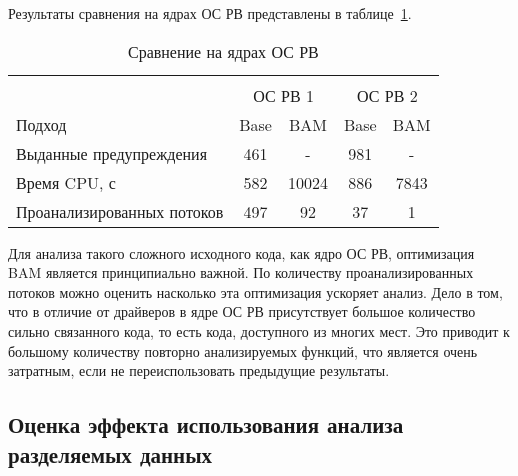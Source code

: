 Результаты сравнения на ядрах ОС РВ представлены в таблице~\ref{table-os-bam}.

  \begin{table}[h]\footnotesize \centering
    \caption{Сравнение на ядрах ОС РВ}
  	\label{table-os-bam}
    \begin{tabular}{ | l | c | c | c | c |  }
      \hline
      		& 		\multicolumn{4}{c|}{\combatmode}  \\
      		& 			 \multicolumn{2}{c|}{ОС РВ 1} & 	\multicolumn{2}{c|}{ОС РВ 2}\\ \hline
      Подход         					& Base  & BAM  		& Base  & BAM 	\\ \hline
      Выданные предупреждения			& 461   & - 	   	& 981   & -  			\\ 
  	  Время CPU, с 						& 582   & 10024		& 886   & 7843  		\\ 
      Проанализированных потоков		& 497   & 92    	& 37   	& 1  			\\ \hline
    \end{tabular}
  \end{table}

Для анализа такого сложного исходного кода, как ядро ОС РВ, оптимизация BAM является принципиально важной.
По количеству проанализированных потоков можно оценить насколько эта оптимизация ускоряет анализ.
Дело в том, что в отличие от драйверов в ядре ОС РВ присутствует большое количество сильно связанного кода, то есть кода, доступного из многих мест. 
Это приводит к большому количеству повторно анализируемых функций, что является очень затратным, если не переиспользовать предыдущие результаты.

%
%

\subsection{Оценка эффекта использования анализа разделяемых данных}

